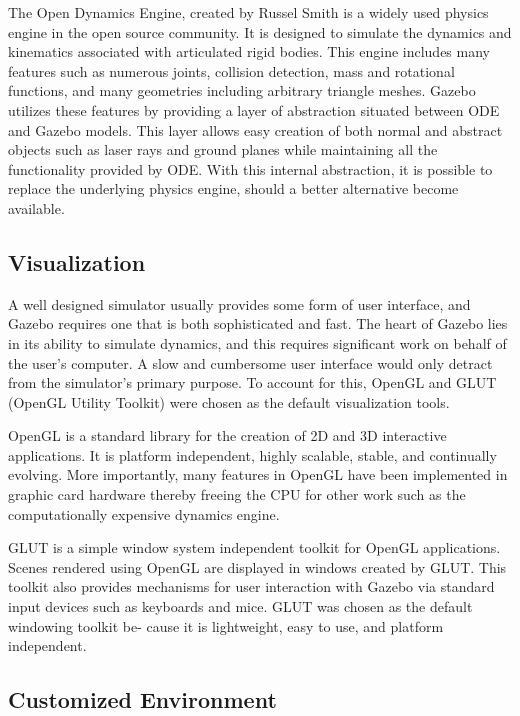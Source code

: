 The Open Dynamics Engine, created by Russel Smith is a widely used physics engine in the open source community. It is designed to simulate the dynamics and kinematics associated with articulated rigid bodies. This engine includes many features such as numerous joints, collision detection, mass and rotational functions, and many geometries including arbitrary triangle meshes. Gazebo utilizes these features by providing a layer of abstraction situated between ODE and Gazebo models. This layer allows easy creation of both normal and abstract objects such as laser rays and ground planes while maintaining all the functionality provided by ODE. With this internal abstraction, it is possible to replace the underlying physics engine, should a better alternative become available.

\subsection{Visualization}

A well designed simulator usually provides some form of user interface, and Gazebo requires one that is both sophisticated and fast. The heart of Gazebo lies in its ability to simulate dynamics, and this requires significant work on behalf of the user's computer. A slow and cumbersome user interface would only detract from the simulator's primary purpose. To account for this, OpenGL and GLUT (OpenGL Utility Toolkit) were chosen as the default visualization tools.

OpenGL is a standard library for the creation of 2D and 3D interactive applications. It is platform independent, highly scalable, stable, and continually evolving. More importantly, many features in OpenGL have been implemented in graphic card hardware thereby freeing the CPU for other work such as the computationally expensive dynamics engine.

GLUT is a simple window system independent toolkit for OpenGL applications. Scenes rendered using OpenGL are displayed in windows created by GLUT. This toolkit also provides mechanisms for user interaction with Gazebo via standard input devices such as keyboards and mice. GLUT was chosen as the default windowing toolkit be- cause it is lightweight, easy to use, and platform independent.

\subsection{Customized Environment}

